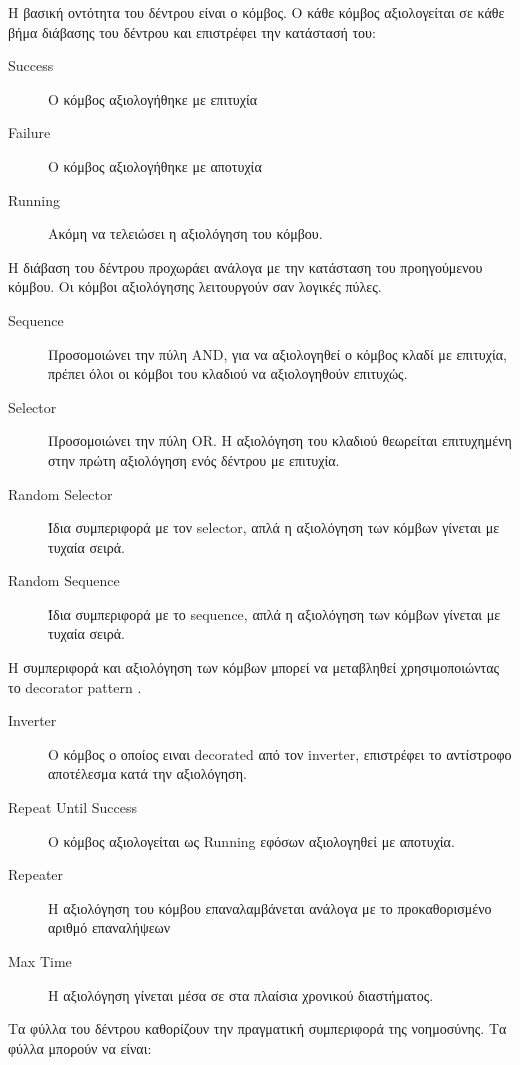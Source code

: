 Η βασική οντότητα του δέντρου είναι ο κόμβος. Ο κάθε κόμβος αξιολογείται σε κάθε βήμα διάβασης του δέντρου και επιστρέφει την κατάστασή του:
\begin{description}
	\item [Success] Ο κόμβος αξιολογήθηκε με επιτυχία
	\item [Failure] Ο κόμβος αξιολογήθηκε με αποτυχία
	\item [Running] Ακόμη να τελειώσει η αξιολόγηση του κόμβου.
\end{description}

Η διάβαση του δέντρου προχωράει ανάλογα με την κατάσταση του προηγούμενου κόμβου. Οι κόμβοι αξιολόγησης λειτουργούν σαν λογικές πύλες.

\begin{description}
	\item [Sequence] Προσομοιώνει την πύλη AND, για να αξιολογηθεί ο κόμβος κλαδί με επιτυχία, πρέπει όλοι οι κόμβοι του κλαδιού να αξιολογηθούν επιτυχώς.
	\item [Selector] Προσομοιώνει την πύλη ΟR. Η αξιολόγηση του κλαδιού θεωρείται επιτυχημένη στην πρώτη αξιολόγηση ενός δέντρου με επιτυχία.
	\item [Random Selector] Ίδια συμπεριφορά με τον selector, απλά η αξιολόγηση των κόμβων γίνεται με τυχαία σειρά.
	\item [Random Sequence] Ίδια συμπεριφορά με το sequence, απλά η αξιολόγηση των κόμβων γίνεται με τυχαία σειρά.
\end{description}
	
H συμπεριφορά και αξιολόγηση των κόμβων μπορεί να μεταβληθεί χρησιμοποιώντας το decorator pattern \cite{Gamma:1995:DPE:186897}.

\begin{description}
	\item [Inverter] Ο κόμβος ο οποίος ειναι decorated από τον inverter, επιστρέφει το αντίστροφο αποτέλεσμα κατά την αξιολόγηση.
	\item [Repeat Until Success] O κόμβος αξιολογείται ως Running εφόσων αξιολογηθεί με αποτυχία. 
	\item [Repeater] Η αξιολόγηση του κόμβου επαναλαμβάνεται ανάλογα με το προκαθορισμένο αριθμό επαναλήψεων
	\item [Max Time] Η αξιολόγηση γίνεται μέσα σε στα πλαίσια χρονικού διαστήματος.
\end{description}

Τα φύλλα του δέντρου καθορίζουν την πραγματική συμπεριφορά της νοημοσύνης. Τα φύλλα μπορούν να είναι:


